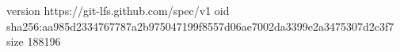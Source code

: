version https://git-lfs.github.com/spec/v1
oid sha256:aa985d2334767787a2b975047199f8557d06ae7002da3399e2a3475307d2c3f7
size 188196
